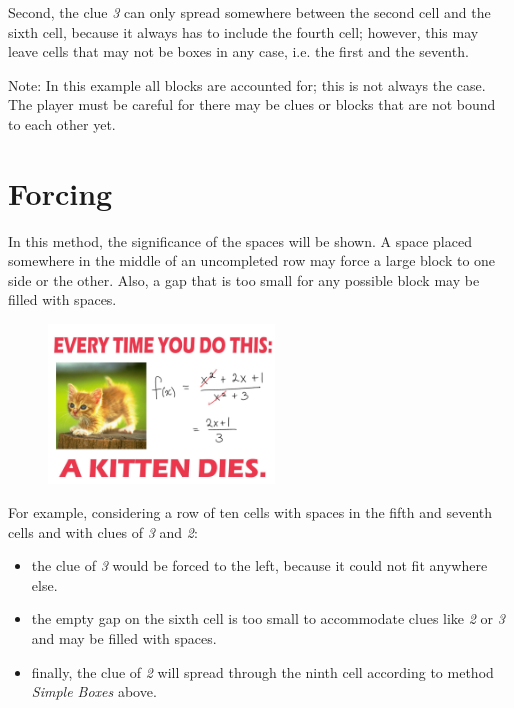 Second, the clue \textit{3} can only spread somewhere between the second cell and the sixth cell, because it always has to include the fourth cell; however, this may leave cells that may not be boxes in any case, i.e. the first and the seventh.

Note: In this example all blocks are accounted for; this is not always the case. The player must be careful for there may be clues or blocks that are not bound to each other yet.


\section{Forcing}
In this method, the significance of the spaces will be shown. A space placed somewhere in the middle of an uncompleted row may force a large block to one side or the other. Also, a gap that is too small for any possible block may be filled with spaces.
\begin{figure}
\centering
\includegraphics[width=6cm]{picture/obr.jpg}
\end{figure}
For example, considering a row of ten cells with spaces in the fifth and seventh cells and with clues of \textit{3} and \textit{2}:

\begin{itemize} 
 \item {the clue of \textit{3} would be forced to the left, because it could not fit anywhere else.}

\item {the empty gap on the sixth cell is too small to accommodate clues like \textit{2} or \textit{3} and may be filled with spaces.}

\item {finally, the clue of \textit{2} will spread through the ninth cell according to method \textit{Simple Boxes} above.} 
\end{itemize}



